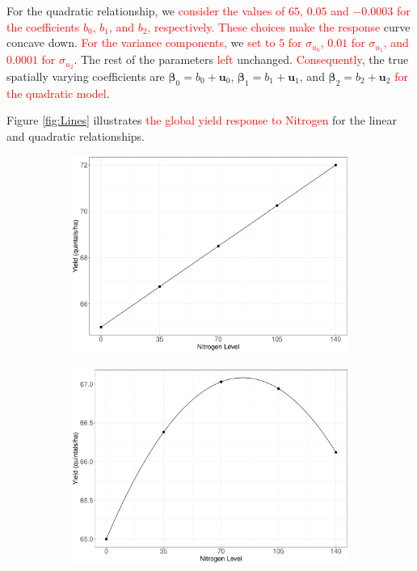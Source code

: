 \documentclass[a4paper]{article} 	%
\newcommand{\revision}[1]{\textcolor{red}{#1}}
\newcommand{\zc}[1]{\textcolor{red}{#1}}
\begin{document}
For the quadratic relationship, we \revision{consider the} \zc{values of $65$, $0.05$ and $-0.0003$ for the coefficients $b_0$, $b_1$, and $b_2$, respectively.} \revision{These choices make the response} curve concave down. \revision{For the variance components,} we \zc{set to $5$ for $\sigma_{u_0}$, $0.01$ for $\sigma_{u_1}$, and $0.0001$ for $\sigma_{u_2}$}. The rest of the parameters \revision{left} unchanged. \revision{Consequently}, the true spatially varying coefficients are $\bm{\beta}_0 = b_0 + \bm{u}_0$, $\bm{\beta}_1 = b_1 + \bm{u}_1$, and $\bm{\beta}_2 = b_2 + \bm{u}_2$ \zc{for the quadratic model}. 

Figure \ref{fig:Lines} illustrates \revision{the global yield response to Nitrogen} for the linear and quadratic relationships.
\begin{figure}[H]
	\begin{subfigure}[t]{0.45\textwidth}
		\centering
		\includegraphics[width=\linewidth]{LinlinesV2.pdf}
 \end{subfigure}
	\hspace{0.05\textwidth}
	\begin{subfigure}[t]{0.45\textwidth}
		\centering
		\includegraphics[width=\linewidth]{QualinesV2.pdf}

\end{subfigure}
\end{figure}
\end{document}
